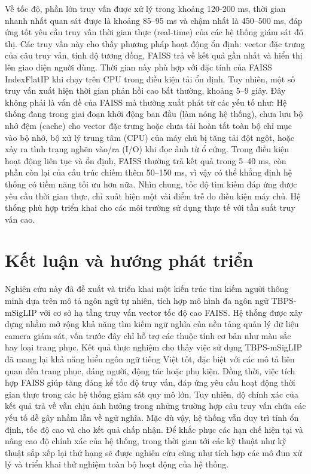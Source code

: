 \documentclass{jstarticle}
\begin{document}
Về tốc độ, phần lớn truy vấn được xử lý trong khoảng 120-200 ms, thời gian nhanh nhất quan sát được là khoảng 85–95 ms và chậm nhất là 450–500 ms, đáp ứng tốt yêu cầu truy vấn thời gian thực (real-time) của các hệ thống giám sát đô thị. Các truy vấn này cho thấy phương pháp hoạt động ổn định: vector đặc trưng của câu truy vấn, tính độ tương đồng, FAISS trả về kết quả gần nhất và hiển thị lên giao diện nguời dùng. Thời gian này phù hợp với đặc tính của FAISS IndexFlatIP khi chạy trên CPU trong điều kiện tải ổn định. Tuy nhiên, một số truy vấn xuất hiện thời gian phản hồi cao bất thường, khoảng 5–9 giây. Đây không phải là vấn đề của FAISS mà thường xuất phát từ các yếu tố như: Hệ thống đang trong giai đoạn khởi động ban đầu (làm nóng hệ thống), chưa lưu bộ nhớ đệm (cache) cho vector đặc trưng hoặc chưa tải hoàn tất toàn bộ chỉ mục vào bộ nhớ, bộ xử lý trung tâm (CPU) của máy chủ bị tăng tải đột ngột, hoặc xảy ra tình trạng nghẽn vào/ra (I/O) khi đọc ảnh từ ổ cứng. Trong điều kiện hoạt động liên tục và ổn định, FAISS thường trả kết quả trong 5–40 ms, còn phần còn lại của cấu trúc chiếm thêm 50–150 ms, vì vậy có thể khẳng định hệ thống có tiềm năng tối ưu hơn nữa. Nhìn chung, tốc độ tìm kiếm đáp ứng được yêu cầu thời gian thực, chỉ xuất hiện một vài điểm trễ do điều kiện máy chủ. Hệ thống phù hợp triển khai cho các môi trường sử dụng thực tế với tần suất truy vấn cao.
\section{Kết luận và hướng phát triển}
Nghiên cứu này đã đề xuất và triển khai một kiến trúc tìm kiếm người thông minh dựa trên mô tả ngôn ngữ tự nhiên, tích hợp mô hình đa ngôn ngữ TBPS-mSigLIP với cơ sở hạ tầng truy vấn vector tốc độ cao FAISS. Hệ thống được xây dựng nhằm mở rộng khả năng tìm kiếm ngữ nghĩa của nền tảng quản lý dữ liệu camera giám sát, vốn trước đây chỉ hỗ trợ các thuộc tính cơ bản như màu sắc hay loại trang phục. Kết quả thực nghiệm cho thấy việc sử dụng TBPS-mSigLIP đã mang lại khả năng hiểu ngôn ngữ tiếng Việt tốt, đặc biệt với các mô tả liên quan đến trang phục, dáng người, động tác hoặc phụ kiện. Đồng thời, việc tích hợp FAISS giúp tăng đáng kể tốc độ truy vấn, đáp ứng yêu cầu hoạt động thời gian thực trong các hệ thống giám sát quy mô lớn. Tuy nhiên, độ chính xác của kết quả trả về vẫn chịu ảnh hưởng trong những trường hợp câu truy vấn chứa các yếu tố dễ gây nhầm lẫn về ngữ nghĩa. 
 Mặc dù vậy, hệ thống vẫn duy trì tính ổn định, tốc độ cao và cho kết quả chấp nhận. Để khắc phục các hạn chế hiện tại và nâng cao độ chính xác của hệ thống, trong thời gian tới các kỹ thuật như kỹ thuật sắp xếp lại thứ hạng sẽ được nghiên cứu cũng như tích hợp các mô đun xử lý và triển khai thử nghiệm toàn bộ hoạt động của hệ thống.  
 
\end{document}

